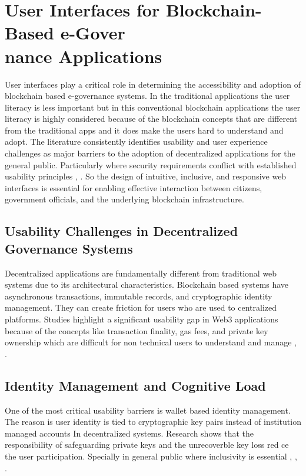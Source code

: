 \section{User Interfaces for Blockchain-Based e-Gover\\nance Applications}

User interfaces play a critical role in determining the accessibility and adoption of blockchain based e-governance systems. In the traditional applications the user literacy is less important but in this conventional blockchain applications the user literacy is highly considered because of the blockchain concepts that are different from the traditional apps and it does make the users hard to understand and adopt. The literature consistently identifies usability and user experience challenges as major barriers to the adoption of decentralized applications for the general public. Particularly where security requirements conflict with established usability principles \cite{mdpi2025usercentric}, \cite{sonule2025uxweb3}. So the design of intuitive, inclusive, and responsive web interfaces is essential for enabling effective interaction between citizens, government officials, and the underlying blockchain infrastructure.

\subsection{Usability Challenges in Decentralized Governance Systems}

Decentralized applications are fundamentally different from traditional web systems due to its architectural characteristics. Blockchain based systems have asynchronous transactions, immutable records, and cryptographic identity management. They can create friction for users who are used to centralized platforms. Studies highlight a significant usability gap in Web3 applications because of the concepts like transaction finality, gas fees, and private key ownership which are difficult for non technical users to understand and manage  \cite{mdpi2025usercentric}, \cite{sonule2025uxweb3}.

\subsection{Identity Management and Cognitive Load}

One of the most critical usability barriers is wallet based identity management. The reason is user identity is tied to cryptographic key pairs instead of institution managed accounts In decentralized systems. Research shows that the responsibility of safeguarding private keys and the unrecoverble key loss red ce the user participation. Specially in general public where inclusivity is essential \cite{sonule2025uxweb3}, \cite{ramotion2026uiux}, \cite{fintechweekly2025usability}.  

